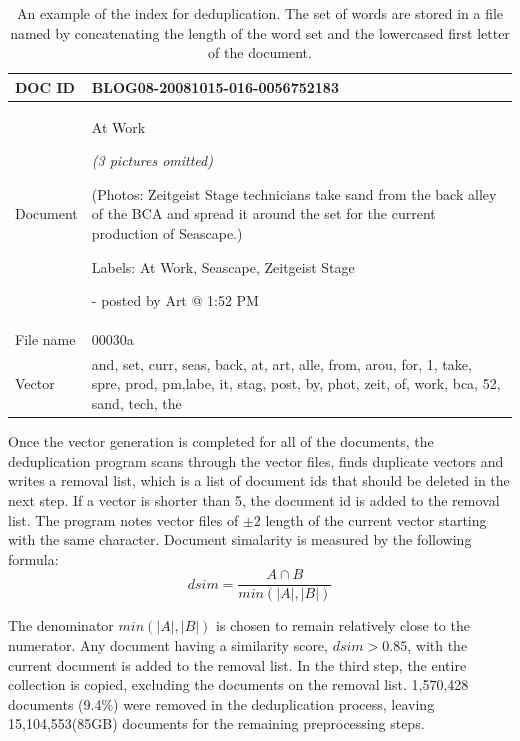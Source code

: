 \documentclass{sig-alternate}
\begin{document}
\begin{table}[h!t!]
\begin{center}
\begin{tabular}{l|p{6.0cm}}

\hline
DOC ID & BLOG08-20081015-016-0056752183\\ 

\hline
Document & 

At Work


\emph{(3 pictures omitted)}



(Photos: Zeitgeist Stage technicians take sand from the back alley of the BCA and spread it around the set for the current production of Seascape.)

Labels: At Work, Seascape, Zeitgeist Stage


- posted by Art @ 1:52 PM\\
\hline
File name& 00030a\\
\hline
Vector & and, set, curr, seas, back, at, art, alle, from, arou, for, 1, take, spre, prod, pm,labe, it, stag, post, by, phot, zeit, of, work, bca, 52, sand, tech, the\\

\hline
\end{tabular}
\caption{An example of the index for deduplication. The set of words are stored in a file named by concatenating the length of the word set and the lowercased first letter of the document.}
\label{table:dedup}
\end{center}
\end{table}

Once the vector generation is completed for all of the documents, the deduplication program scans through the vector files, finds duplicate vectors and writes a removal list, which is a list of document ids that should be deleted in the next step. If a vector is shorter than 5, the document id is added to the removal list. The program notes vector files of $\pm 2$ length of the current vector starting with the same character. Document simalarity is measured by the following formula:
\begin{displaymath}
dsim=\frac{A \cap B}  {min(|A|, |B|)}
\end{displaymath}

The denominator $min(|A|, |B|)$ is chosen to remain relatively close to the numerator. Any document having a similarity score, $dsim > 0.85$, with the current document is added to the removal list. In the third step, the entire collection is copied, excluding the documents on the removal list. 1,570,428 documents (9.4\%) were removed in the deduplication process, leaving 15,104,553(85GB) documents for the remaining preprocessing steps.
\end{document}
